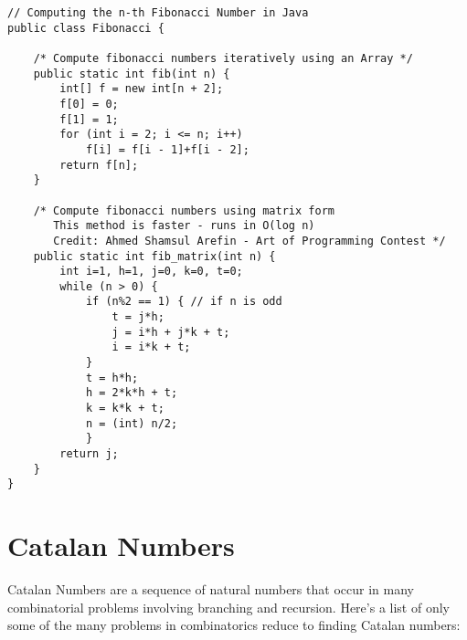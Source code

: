 \lstset{
	language=java,
	tabsize=4,
	basicstyle=\footnotesize,
}
\begin{lstlisting}
// Computing the n-th Fibonacci Number in Java
public class Fibonacci {

	/* Compute fibonacci numbers iteratively using an Array */
	public static int fib(int n) {
		int[] f = new int[n + 2];
		f[0] = 0;
		f[1] = 1;
		for (int i = 2; i <= n; i++)
			f[i] = f[i - 1]+f[i - 2];
		return f[n];
	}

	/* Compute fibonacci numbers using matrix form
	   This method is faster - runs in O(log n)
	   Credit: Ahmed Shamsul Arefin - Art of Programming Contest */
	public static int fib_matrix(int n) {
		int i=1, h=1, j=0, k=0, t=0;
		while (n > 0) {
			if (n%2 == 1) { // if n is odd
				t = j*h;
				j = i*h + j*k + t;
				i = i*k + t;
			}
			t = h*h;
			h = 2*k*h + t;
			k = k*k + t;
			n = (int) n/2;
			} 
		return j;
	}
}
\end{lstlisting}

\section{Catalan Numbers}

Catalan Numbers are a sequence of natural numbers that occur in many combinatorial problems involving branching and recursion. Here's a list of only some of the many problems in combinatorics reduce to finding Catalan numbers:

